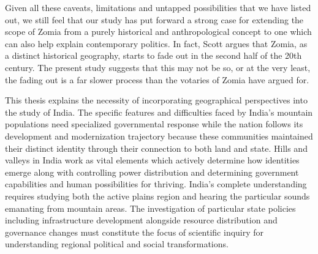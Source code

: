 \begin{sloppypar}
Given all these caveats, limitations and untapped possibilities that we have listed out, we still feel that our study has put forward a strong case for extending the scope of Zomia from a purely historical and anthropological concept to one which can also help explain contemporary politics. In fact, Scott argues that Zomia, as a distinct historical geography, starts to fade out in the second half of the 20th century. The present study suggests that this may not be so, or at the very least, the fading out is a far slower process than the votaries of Zomia have argued for.  

\vspace{0.3cm}

This thesis explains the necessity of incorporating geographical perspectives into the study of India. The specific features and difficulties faced by India's mountain populations need specialized governmental response while the nation follows its development and modernization trajectory because these communities maintained their distinct identity through their  connection to both land and state. Hills and valleys in India work as vital elements which actively determine how identities emerge along with controlling power distribution and determining government capabilities and human possibilities for thriving. India's complete understanding requires studying both the active plains region and hearing the particular sounds emanating from mountain areas.  The investigation of particular state policies including infrastructure development alongside resource distribution and governance changes must constitute the focus of scientific inquiry for understanding regional political and social transformations.

\end{sloppypar}